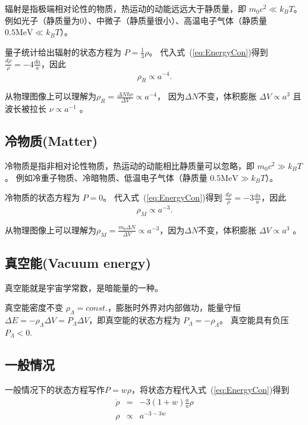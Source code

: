 \documentclass[]{ctexart}
\newcommand{\refeq}[1]{式~(\ref{#1})}
\begin{document}
辐射是指极端相对论性的物质，热运动的动能远远大于静质量，即 $m_0 c^2 \ll k_B T$。
例如光子（静质量为0）、中微子（静质量很小）、高温电子气体（静质量 $0.5 \mathrm{MeV} \ll k_B T$）。

量子统计给出辐射的状态方程为 $P=\frac{1}{3}\rho$。
代入\refeq{eq:EnergyCon}得到 $\frac{d\rho}{\rho} = -4\frac{da}{a}$，因此 
\begin{equation}
    \rho_R\propto a^{-4}.
\end{equation}

从物理图像上可以理解为$\rho_R = \frac{\Delta N \hbar\nu }{\Delta V}\propto a^{-4}$， 因为$\Delta N$不变，体积膨胀 $\Delta V \propto a^{3}$ 且 波长被拉长 $\nu \propto a^{-1}$ 。

\subsection{冷物质(Matter)}

冷物质是指非相对论性物质，热运动的动能相比静质量可以忽略，即 $m_0 c^2 \gg k_B T$。
例如冷重子物质、冷暗物质、低温电子气体（静质量 $0.5 \mathrm{MeV} \gg k_B T$）。

冷物质的状态方程为 $P=0$。
代入\refeq{eq:EnergyCon}得到 $\frac{d\rho}{\rho} = -3\frac{da}{a}$，因此
\begin{equation}
    \rho_M\propto a^{-3}.
\end{equation} 

从物理图像上可以理解为$\rho_M = \frac{m_0 \Delta N}{\Delta V}\propto a^{-3}$，因为$\Delta N$不变，体积膨胀 $\Delta V \propto a^{3}$ 。

\subsection{真空能(Vacuum energy)}

真空能就是宇宙学常数，是暗能量的一种。

真空能密度不变 $\rho_\Lambda=const.$，膨胀时外界对内部做功，能量守恒$\Delta E = -\rho_\Lambda \Delta V = P_\Lambda \Delta V$，即真空能的状态方程为 $P_\Lambda = -\rho_\Lambda$。 真空能具有负压 $P_\Lambda < 0 $.

\subsection{一般情况}

一般情况下的状态方程写作$P=w\rho$，将状态方程代入\refeq{eq:EnergyCon}得到
\begin{eqnarray}
    \dot{\rho} &=& -3(1+w) \frac{\dot{a}}{a} \rho 
    \\ \rho &\propto& a^{-3-3w}
\end{eqnarray}
\end{document}
